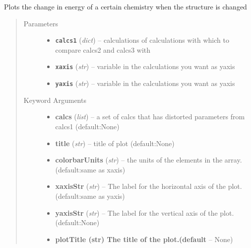 \documentclass[letterpaper,10pt,english]{sphinxmanual}
\begin{document}

\begin{fulllineitems}
\label{plot:plot.__distortionEnergy}
Plots the change in energy of a certain chemistry when the structure is changed
\begin{quote}\begin{description}
\item[{Parameters}] \leavevmode\begin{itemize}
\item {} 
\textbf{\texttt{calcs1}} (\emph{dict}) -- calculations of calculations with which to compare calcs2 and calcs3 with

\item {} 
\textbf{\texttt{xaxis}} (\emph{str}) -- variable in the calculations you want as yaxis

\item {} 
\textbf{\texttt{yaxis}} (\emph{str}) -- variable in the calculations you want as yaxis

\end{itemize}

\item[{Keyword Arguments}] \leavevmode\begin{itemize}
\item {} 
\textbf{calcs} (\emph{list}) --
a set of calcs that has distorted parameters from calcs1 (default:None)

\item {} 
\textbf{title} (\emph{str}) --
title of plot (default:None)

\item {} 
\textbf{colorbarUnits} (\emph{str}) --
the units of the elements in the array.(default:same as xaxis)

\item {} 
\textbf{xaxisStr} (\emph{str}) --
The label for the horizontal axis of the plot.(default:same as yaxis)

\item {} 
\textbf{yaxisStr} (\emph{str}) --
The label for the vertical axis of the plot.(default:None)

\item {} 
\textbf{plotTitle (str) The title of the plot.(default} --
None)


\end{itemize}
\end{description}
\end{quote}
\end{fulllineitems}
\end{document}
